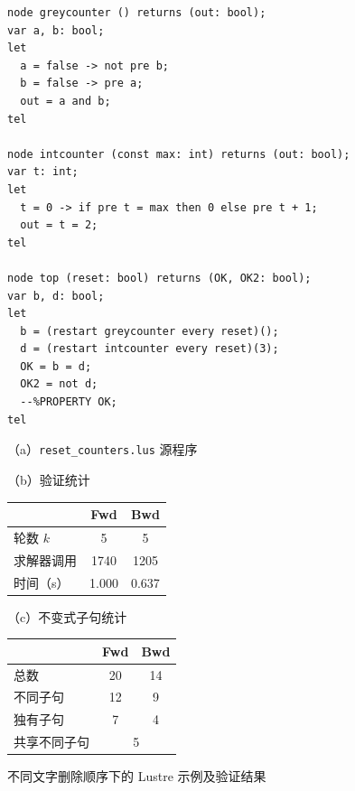 \documentclass[11pt,a4paper]{article}
\begin{document}
\begin{figure}[htbp]
  \centering
  \begin{minipage}[t]{0.62\textwidth}
    \vspace{0pt}
\begin{lstlisting}[style=lustre-small]
node greycounter () returns (out: bool);
var a, b: bool;
let
  a = false -> not pre b;
  b = false -> pre a;
  out = a and b;
tel

node intcounter (const max: int) returns (out: bool);
var t: int;
let
  t = 0 -> if pre t = max then 0 else pre t + 1;
  out = t = 2;
tel

node top (reset: bool) returns (OK, OK2: bool);
var b, d: bool;
let
  b = (restart greycounter every reset)();
  d = (restart intcounter every reset)(3);
  OK = b = d;
  OK2 = not d;
  --%PROPERTY OK;
tel
\end{lstlisting}
    \centering\small （a）\texttt{reset\_counters.lus} 源程序
  \end{minipage}
  \hfill
  \begin{minipage}[t]{0.33\textwidth}
    \vspace{0pt}
    \centering
    \small
    （b）验证统计

    \vspace{0.4em}
    \begin{tabular}{lcc}
      \toprule
       & Fwd & Bwd\\
      \midrule
      轮数 $k$ & 5 & 5\\
      求解器调用 & 1740 & 1205\\
      时间（s） & 1.000 & 0.637\\
      \bottomrule
    \end{tabular}

    \vspace{1em}
    （c）不变式子句统计

    \vspace{0.4em}
    \begin{tabular}{lcc}
      \toprule
       & Fwd & Bwd\\
      \midrule
      总数 & 20 & 14\\
      不同子句 & 12 & 9\\
      独有子句 & 7 & 4\\
      共享不同子句 & \multicolumn{2}{c}{5}\\
      \bottomrule
    \end{tabular}
  \end{minipage}
  \caption{不同文字删除顺序下的 Lustre 示例及验证结果}
  \label{fig:reset-counter-order}
\end{figure}
\end{document}
